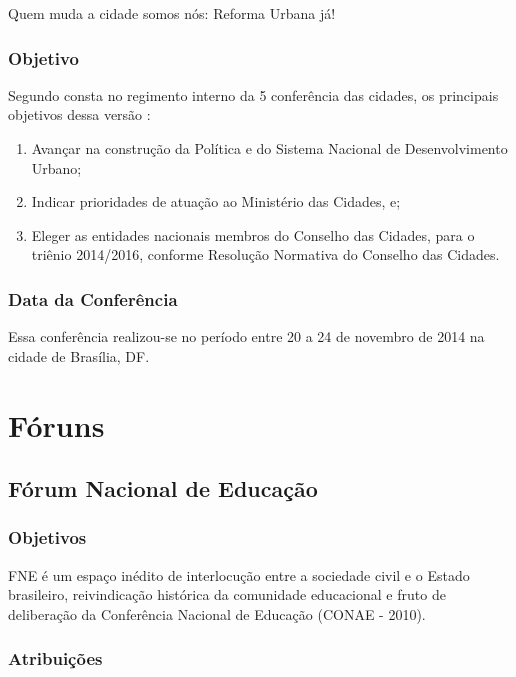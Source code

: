 Quem muda a cidade somos nós: Reforma Urbana
já!


\subsubsection*{Objetivo}


Segundo consta no regimento interno da 5 conferência das cidades, os
principais objetivos dessa versão :


\begin{enumerate}
\item Avançar na construção da Política e do Sistema Nacional de
Desenvolvimento Urbano;
\item Indicar prioridades de atuação ao Ministério das Cidades, e;
\item Eleger as entidades nacionais membros do Conselho das Cidades, para o
triênio 2014/2016, conforme Resolução Normativa do Conselho das
Cidades.
\end{enumerate}

\subsubsection*{Data da Conferência}


Essa conferência realizou-se no período entre 20 a 24 de novembro de
2014 na cidade de Brasília, DF.
\newpage
\section*{Fóruns}

\subsection*{Fórum Nacional de Educação}

\subsubsection*{Objetivos}

FNE é um espaço inédito de interlocução entre a sociedade
civil e o Estado brasileiro, reivindicação histórica da
comunidade educacional e fruto de deliberação da Conferência
Nacional de Educação (CONAE - 2010).


\subsubsection*{Atribuições}


